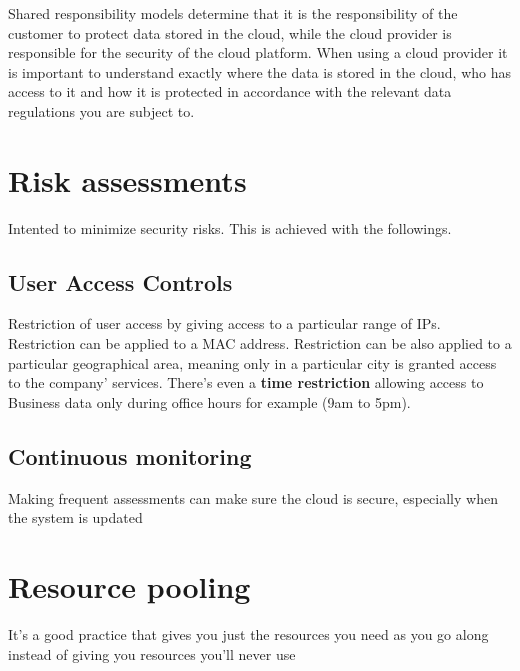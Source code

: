 \documentclass[a4paper,12pt]{book}
\begin{document}
Shared responsibility models determine that it is the responsibility of the customer to protect data stored in the cloud, while the cloud provider is responsible for the security of the cloud platform. When using a cloud provider it is important to understand exactly where the data is stored in the cloud, who has access to it and how it is protected in accordance with the relevant data regulations you are subject to.

\section{Risk assessments}
Intented to minimize security risks. This is achieved with the followings.
\subsection{User Access Controls}
Restriction of user access by giving access to a particular range of IPs. Restriction can be applied to a MAC address. Restriction can be also applied to a particular geographical area, meaning only in a particular city is granted access to the company' services. There's even a \textbf{time restriction} allowing access to Business data only during office hours for example (9am to 5pm).
\subsection{Continuous monitoring}
Making frequent assessments can make sure the cloud is secure, especially when the system is updated 
\section{Resource pooling}
It's a good practice that gives you just the resources you need as you go along instead of giving you resources you'll never use
\clearpage
\printindex
\end{document}
